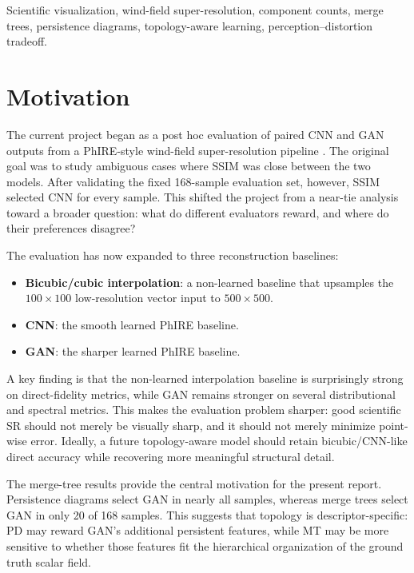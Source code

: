 \documentclass[conference]{IEEEtran}
\begin{document}
\begin{IEEEkeywords}
Scientific visualization, wind-field super-resolution, component counts, merge trees, persistence diagrams, topology-aware learning, perception--distortion tradeoff.
\end{IEEEkeywords}

\section{Motivation}

The current project began as a post hoc evaluation of paired CNN and GAN outputs from a PhIRE-style wind-field super-resolution pipeline \cite{StengelPhIRE_2020}. The original goal was to study ambiguous cases where SSIM was close between the two models. After validating the fixed 168-sample evaluation set, however, SSIM selected CNN for every sample. This shifted the project from a near-tie analysis toward a broader question: what do different evaluators reward, and where do their preferences disagree?

The evaluation has now expanded to three reconstruction baselines:
\begin{itemize}
    \item \textbf{Bicubic/cubic interpolation}: a non-learned baseline that upsamples the $100\times100$ low-resolution vector input to $500\times500$.
    \item \textbf{CNN}: the smooth learned PhIRE baseline.
    \item \textbf{GAN}: the sharper learned PhIRE baseline.
\end{itemize}

A key finding is that the non-learned interpolation baseline is surprisingly strong on direct-fidelity metrics, while GAN remains stronger on several distributional and spectral metrics. This makes the evaluation problem sharper: good scientific SR should not merely be visually sharp, and it should not merely minimize point-wise error. Ideally, a future topology-aware model should retain bicubic/CNN-like direct accuracy while recovering more meaningful structural detail.

The merge-tree results provide the central motivation for the present report. Persistence diagrams select GAN in nearly all samples, whereas merge trees select GAN in only 20 of 168 samples. This suggests that topology is descriptor-specific: PD may reward GAN's additional persistent features, while MT may be more sensitive to whether those features fit the hierarchical organization of the ground truth scalar field.
\end{document}
